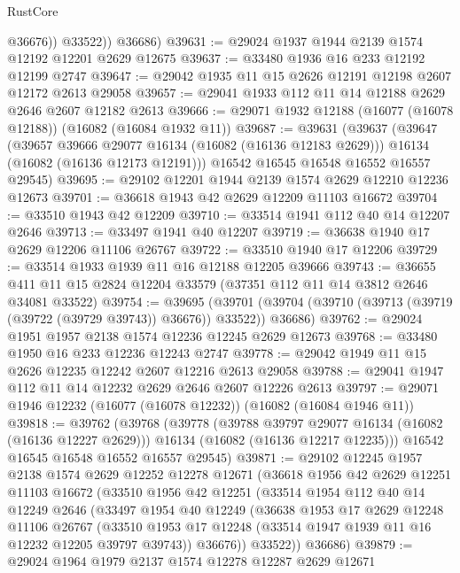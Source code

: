 \begin{lexlean}{RustCore}
\begin{coremodule}
              @36676))
          @33522))
      @36686)
@39631 := @29024 @1937 @1944 @2139 @1574 @12192 @12201 @2629 @12675
@39637 := @33480 @1936 @16 @233 @12192 @12199 @2747
@39647 := @29042 @1935 @11 @15 @2626 @12191 @12198 @2607 @12172 @2613 @29058
@39657 := @29041 @1933 @112 @11 @14 @12188 @2629 @2646 @2607 @12182 @2613
@39666 := @29071 @1932 @12188 (@16077 (@16078 @12188)) (@16082 (@16084 @1932 @11))
@39687 := @39631
    (@39637
      (@39647
        (@39657 @39666 @29077 @16134 (@16082 (@16136 @12183 @2629)))
        @16134
        (@16082 (@16136 @12173 @12191)))
      @16542
      @16545
      @16548
      @16552
      @16557
      @29545)
@39695 := @29102 @12201 @1944 @2139 @1574 @2629 @12210 @12236 @12673
@39701 := @36618 @1943 @42 @2629 @12209 @11103 @16672
@39704 := @33510 @1943 @42 @12209
@39710 := @33514 @1941 @112 @40 @14 @12207 @2646
@39713 := @33497 @1941 @40 @12207
@39719 := @36638 @1940 @17 @2629 @12206 @11106 @26767
@39722 := @33510 @1940 @17 @12206
@39729 := @33514 @1933 @1939 @11 @16 @12188 @12205 @39666
@39743 := @36655 @411 @11 @15 @2824 @12204 @33579 (@37351 @112 @11 @14 @3812 @2646 @34081 @33522)
@39754 := @39695
    (@39701 (@39704 (@39710 (@39713 (@39719 (@39722 (@39729 @39743)) @36676)) @33522)) @36686)
@39762 := @29024 @1951 @1957 @2138 @1574 @12236 @12245 @2629 @12673
@39768 := @33480 @1950 @16 @233 @12236 @12243 @2747
@39778 := @29042 @1949 @11 @15 @2626 @12235 @12242 @2607 @12216 @2613 @29058
@39788 := @29041 @1947 @112 @11 @14 @12232 @2629 @2646 @2607 @12226 @2613
@39797 := @29071 @1946 @12232 (@16077 (@16078 @12232)) (@16082 (@16084 @1946 @11))
@39818 := @39762
    (@39768
      (@39778
        (@39788 @39797 @29077 @16134 (@16082 (@16136 @12227 @2629)))
        @16134
        (@16082 (@16136 @12217 @12235)))
      @16542
      @16545
      @16548
      @16552
      @16557
      @29545)
@39871 := @29102
    @12245
    @1957
    @2138
    @1574
    @2629
    @12252
    @12278
    @12671
    (@36618
      @1956
      @42
      @2629
      @12251
      @11103
      @16672
      (@33510
        @1956
        @42
        @12251
        (@33514
          @1954
          @112
          @40
          @14
          @12249
          @2646
          (@33497
            @1954
            @40
            @12249
            (@36638
              @1953
              @17
              @2629
              @12248
              @11106
              @26767
              (@33510 @1953 @17 @12248 (@33514 @1947 @1939 @11 @16 @12232 @12205 @39797 @39743))
              @36676))
          @33522))
      @36686)
@39879 := @29024 @1964 @1979 @2137 @1574 @12278 @12287 @2629 @12671

\end{coremodule}
\end{lexlean}
